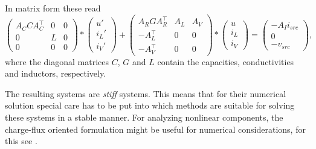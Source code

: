 In matrix form these read
\begin{equation}
	\label{MNA_Matrixform}
	\begin{pmatrix}
		A_C C A_C^\top & 0 & 0 \\
		0 & L & 0 \\
		0 & 0 & 0
	\end{pmatrix}
	*
	\begin{pmatrix}
		u' \\
		i_L' \\
		i_V'
	\end{pmatrix}
	+
	\begin{pmatrix}
		A_R G A_R^\top & A_L & A_V \\
		-A_L^\top & 0 & 0 \\
		-A_V^\top & 0 & 0 
	\end{pmatrix}
	*
	\begin{pmatrix}
		u \\
		i_L \\
		i_V
	\end{pmatrix}
	=
	\begin{pmatrix}
		-A_I i_{src} \\
		0 \\
		-v_{src}
	\end{pmatrix} , 
\end{equation}
where the diagonal matrices $C$, $G$ and $L$ contain the capacities, conductivities and inductors, respectively.

The resulting systems are \emph{stiff} systems. This means that for their numerical solution special care has to be put into which methods are suitable for solving these systems in a stable manner. For analyzing nonlinear components, the charge-flux oriented formulation might be useful for numerical considerations, for this see \cite{ModellingAndDiscretizationOfCircuitProblems}.


